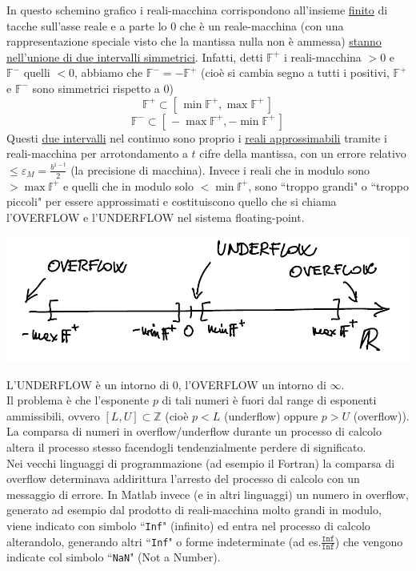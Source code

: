 \documentclass[12pt]{article}
\begin{document}
In questo schemino grafico i reali-macchina corrispondono all'insieme \uline{finito} di tacche sull'asse reale e a parte lo 0 che è un reale-macchina (con una rappresentazione speciale visto che la mantissa nulla non è ammessa) \uline{stanno nell'unione di due intervalli simmetrici}. Infatti, detti $\mathbb{F}^+$ i reali-macchina $>0$ e $\mathbb{F}^-$ quelli $<0$, abbiamo che $\mathbb{F}^- = - \mathbb{F}^+$ (cioè si cambia segno a tutti i positivi, $\mathbb{F}^+$ e $\mathbb{F}^-$ sono simmetrici rispetto a 0) 
\[ \mathbb{F}^+ \subset [\,\min \mathbb{F}^+, \max \mathbb{F}^+\,] \]
\[ \mathbb{F}^- \subset [\,- \max \mathbb{F}^+, - \min \mathbb{F}^+\,] \]
Questi \uline{due intervalli} nel continuo sono proprio i \uline{reali approssimabili} tramite i reali-macchina per arrotondamento a $t$ cifre della mantissa, con un errore relativo $\le \varepsilon_M = \frac{b^{1-t}}{2}$ (la precisione di macchina). Invece i reali che in modulo sono $> \max \mathbb{f}^+$ e quelli che in modulo solo $< \min \mathbb{f}^+$, sono ``troppo grandi" o ``troppo piccoli" per essere approssimati e costituiscono quello che si chiama l'OVERFLOW e l'UNDERFLOW nel sistema floating-point.\begin{center}
    \includegraphics[scale=0.65]{img3.png}
\end{center}
L'UNDERFLOW è un intorno di 0, l'OVERFLOW un intorno di $\infty$.\\
Il problema è che l'esponente $p$ di tali numeri è fuori dal range di esponenti ammissibili, ovvero $[L,U] \subset \mathbb{Z}$ (cioè $p < L$ (underflow) oppure $p > U$ (overflow)).\\
La comparsa di numeri in overflow/underflow durante un processo di calcolo altera il processo stesso facendogli tendenzialmente perdere di significato. \\
Nei vecchi linguaggi di programmazione (ad esempio il Fortran) la comparsa di overflow determinava addirittura l'arresto del processo di calcolo con un messaggio di errore. In Matlab invece (e in altri linguaggi) un numero in overflow, generato ad esempio dal prodotto di reali-macchina molto grandi in modulo, viene indicato con simbolo ``\texttt{Inf}" (infinito) ed entra nel processo di calcolo alterandolo, generando altri ``\texttt{Inf}" o forme indeterminate (ad es.$\frac{\texttt{Inf}}{\texttt{Inf}}$) che vengono indicate col simbolo ``\texttt{NaN}" (Not a Number).\\
\end{document}
